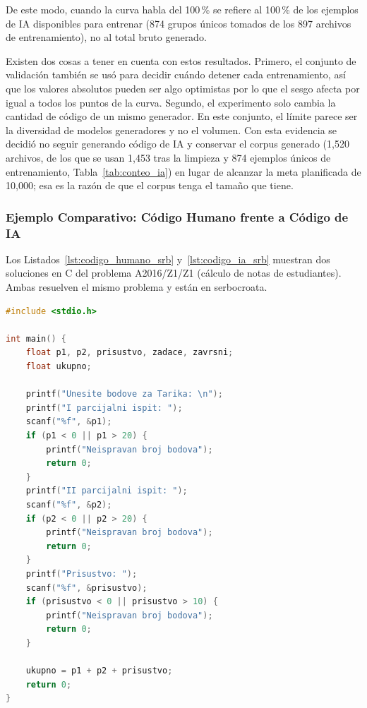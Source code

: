 De este modo, cuando la curva habla del 100\,\% se refiere al 100\,\% de los ejemplos de IA disponibles para entrenar (874 grupos únicos tomados de los 897 archivos de entrenamiento), no al total bruto generado.

Existen dos cosas a tener en cuenta con estos resultados. Primero, el conjunto de validación también se usó para decidir cuándo detener cada entrenamiento, así que los valores absolutos pueden ser algo optimistas por lo que el sesgo afecta por igual a todos los puntos de la curva. Segundo, el experimento solo cambia la cantidad de código de un mismo generador. En este conjunto, el límite parece ser la diversidad de modelos generadores y no el volumen. Con esta evidencia se decidió no seguir generando código de IA y conservar el corpus generado (1,520 archivos, de los que se usan 1,453 tras la limpieza y 874 ejemplos únicos de entrenamiento, Tabla~\ref{tab:conteo_ia}) en lugar de alcanzar la meta planificada de 10,000; esa es la razón de que el corpus tenga el tamaño que tiene.
\subsubsection{Ejemplo Comparativo: Código Humano frente a Código de IA}
\label{subsec:caso_estudio_comparativo}

Los Listados~\ref{lst:codigo_humano_srb} y~\ref{lst:codigo_ia_srb} muestran dos soluciones en C del problema A2016/Z1/Z1 (cálculo de notas de estudiantes). Ambas resuelven el mismo problema y están en serbocroata.

\begin{lstlisting}[language=C, caption={Código humano: estudiante real del curso A2016.}, label={lst:codigo_humano_srb}]
#include <stdio.h>

int main() {
    float p1, p2, prisustvo, zadace, zavrsni;
    float ukupno;

    printf("Unesite bodove za Tarika: \n");
    printf("I parcijalni ispit: ");
    scanf("%f", &p1);
    if (p1 < 0 || p1 > 20) {
        printf("Neispravan broj bodova");
        return 0;
    }
    printf("II parcijalni ispit: ");
    scanf("%f", &p2);
    if (p2 < 0 || p2 > 20) {
        printf("Neispravan broj bodova");
        return 0;
    }
    printf("Prisustvo: ");
    scanf("%f", &prisustvo);
    if (prisustvo < 0 || prisustvo > 10) {
        printf("Neispravan broj bodova");
        return 0;
    }

    ukupno = p1 + p2 + prisustvo;
    return 0;
}
\end{lstlisting}

